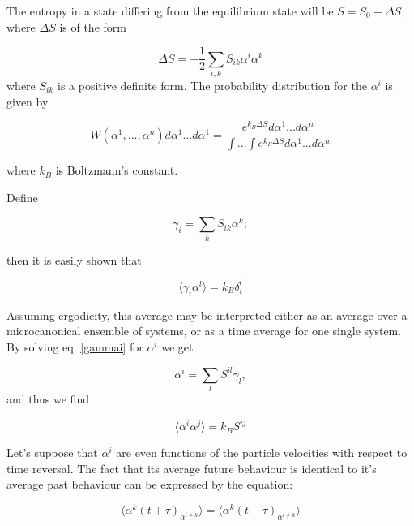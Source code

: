 \documentclass[a4paper,12pt,nofootinbib]{article}
\begin{document}
The entropy in a state differing from the equilibrium state will be $S=S_0+\Delta S$, where $\Delta S$ is of the form

\begin{displaymath}
  \Delta S = - \frac{1}{2} \sum_{i,k} S_{ik} \alpha^i \alpha^k
\end{displaymath}
where $ S_{ik} $ is a positive definite form. The probability distribution for the $\alpha^i$ is given by

\begin{displaymath}
  W(\alpha^1,...,\alpha^n)d\alpha^1 ... d\alpha^1= \frac{e^{k_B \Delta S} d\alpha^1...d\alpha^n}{\int ... \int e^{k_B \Delta S} d\alpha^1...d\alpha^n}
\end{displaymath}

where $k_B$ is Boltzmann's constant.

Define

\begin{equation}
\gamma_i =\sum_k S_{ik} \alpha^k; \label{gammai}	
\end{equation}
  

then it is easily shown that

\begin{equation}
\langle \gamma_i \alpha^l \rangle = k_B \delta_i^l	
\end{equation}

Assuming ergodicity, this average may be interpreted either as an average over a microcanonical ensemble of systems, or as a time average for one single system.
By solving eq. \ref{gammai} for $\alpha^i $ we get

\begin{equation}
  \alpha^i=\sum_l S^{il}\gamma_l,
\end{equation}
and thus we find

\begin{equation}
	\langle \alpha^i \alpha^j \rangle = k_B S^{ij}   
\end{equation}

Let's suppose that $\alpha^i$ are even functions of the particle velocities with respect to time reversal.
The fact that its average future behaviour is identical to it's average past behaviour can be expressed by the equation:

\begin{equation}
  \langle \alpha^k (t+\tau)_{\alpha^{i \neq k}} \rangle =   \langle \alpha^k(t-\tau)_{\alpha^{i \neq k}} \rangle
\end{equation}
\end{document}
